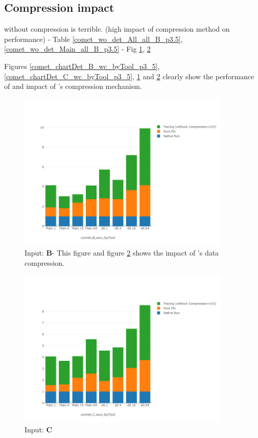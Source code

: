 \subsection{Compression impact} 
\label{subsec:compact}
\parlot without compression is terrible. (high impact of compression method on performance)
 - Table \ref{comet_wo_det_All_all_B_p3.5}, \ref{comet_wo_det_Main_all_B_p3.5}
   - Fig \ref{comet_chartDet_B_woc_byTool_p3_5}, \ref{comet_chartDet_C_woc_byTool_p3_5}
   
Figures \ref{comet_chartDet_B_wc_byTool_p3_5}, \ref{comet_chartDet_C_wc_byTool_p3_5}, \ref{comet_chartDet_B_woc_byTool_p3_5} and \ref{comet_chartDet_C_woc_byTool_p3_5} clearly show the performance of \parlot and impact of \parlot 's compression mechanism.
	


\begin{figure}[!t]
\centering
\includegraphics[width=4in]{figs.comet/comet_chartDet_B_woc_byTool_p3_5.png}
\caption{ Input: \textbf{B}- This figure and figure \ref{comet_chartDet_C_woc_byTool_p3_5} shows the impact of \parlot 's data compression.
}
\label{comet_chartDet_B_woc_byTool_p3_5}
\end{figure}

\begin{figure}[!t]
\centering
\includegraphics[width=4in]{figs.comet/comet_chartDet_C_woc_byTool_p3_5.png}
\caption{ Input: \textbf{C}
}
\label{comet_chartDet_C_woc_byTool_p3_5}
\end{figure}



